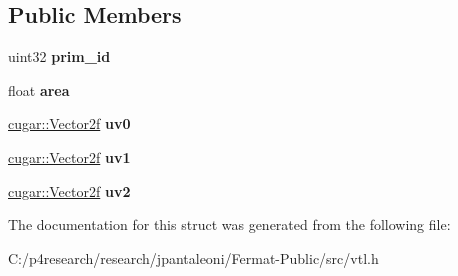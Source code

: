 \subsection*{Public Members}
\begin{DoxyCompactItemize}
\item 
\mbox{\label{struct_v_t_l_a27d7173085410a6a83655bbaa2de22c3}} 
uint32 {\bfseries prim\+\_\+id}
\item 
\mbox{\label{struct_v_t_l_a6eefebb73496108dd301c17ab332981a}} 
float {\bfseries area}
\item 
\mbox{\label{struct_v_t_l_a5df43f944c0eabccb48643c57eb46a30}} 
\hyperlink{structcugar_1_1_vector}{cugar\+::\+Vector2f} {\bfseries uv0}
\item 
\mbox{\label{struct_v_t_l_a07c9e491b80779b9ec0b21587cb925d6}} 
\hyperlink{structcugar_1_1_vector}{cugar\+::\+Vector2f} {\bfseries uv1}
\item 
\mbox{\label{struct_v_t_l_abffda8b518bbab8f22ee093b0fba05ee}} 
\hyperlink{structcugar_1_1_vector}{cugar\+::\+Vector2f} {\bfseries uv2}
\end{DoxyCompactItemize}


The documentation for this struct was generated from the following file\+:\begin{DoxyCompactItemize}
\item 
C\+:/p4research/research/jpantaleoni/\+Fermat-\/\+Public/src/vtl.\+h\end{DoxyCompactItemize}
